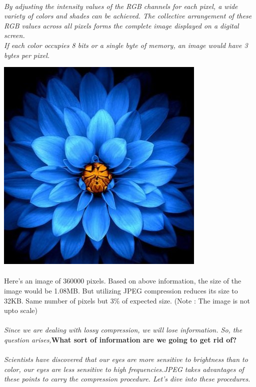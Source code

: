 \documentclass[12pt, letterpaper]{article}
\begin{document}
\paragraph{}\textit{By adjusting the intensity values of the RGB channels for each pixel, a wide variety of colors and shades can be achieved. The collective arrangement of these RGB values across all pixels forms the complete image displayed on a digital screen.\\If each color occupies 8 bits or a single byte of memory, an image would have 3 bytes per pixel. }
\begin{center}
    \includegraphics{Flower.2} 
\end{center}
\paragraph{}Here’s an image of 360000 pixels. Based on above information, the size of the image would be 1.08MB. But utilizing JPEG compression reduces its size to 32KB. Same number of pixels but 3\% of expected size. (Note : The image is not upto scale)
\paragraph{}\textit{Since we are dealing with lossy compression, we will lose information. So, the question arises,}\textbf{What sort of information are we going to get rid of? }
\paragraph{}\textit{Scientists have discovered that our eyes are more sensitive to brightness than to color, our eyes are less sensitive to high frequencies.JPEG takes advantages of these points to carry the compression procedure. Let’s dive into these procedures.}
\end{document}
